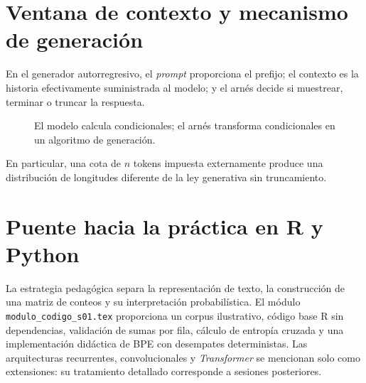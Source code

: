 \section*{Ventana de contexto y mecanismo de generación}
En el generador autorregresivo, el \emph{prompt} proporciona el prefijo;
el contexto es la historia efectivamente suministrada al modelo;
y el arnés decide si muestrear, terminar o truncar la respuesta.
\begin{figure}[H]\centering
{}
\caption{El modelo calcula condicionales; el arnés transforma condicionales en un algoritmo de generación.}
\end{figure}
En particular, una cota de $n$ tokens impuesta externamente produce
una distribución de longitudes diferente de la ley generativa sin truncamiento.

\section*{Puente hacia la práctica en R y Python}
La estrategia pedagógica separa la representación de texto, la construcción
de una matriz de conteos y su interpretación probabilística. El módulo
\texttt{modulo\_codigo\_s01.tex} proporciona un corpus ilustrativo, código base R
sin dependencias, validación de sumas por fila, cálculo de entropía cruzada
y una implementación didáctica de BPE con desempates deterministas.
Las arquitecturas recurrentes, convolucionales y \emph{Transformer} se
mencionan solo como extensiones: su tratamiento detallado corresponde
a sesiones posteriores.
